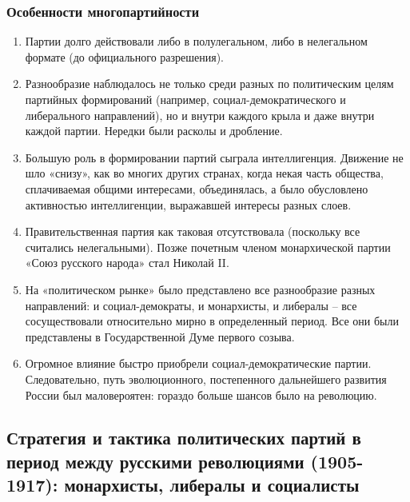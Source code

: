 \documentclass{article}
\begin{document}
\subsubsection{Особенности многопартийности}

\begin{enumerate}
    \item Партии долго действовали либо в полулегальном, либо в нелегальном формате (до официального разрешения).
    \item Разнообразие наблюдалось не только среди разных по политическим целям партийных формирований (например, социал-демократического и либерального направлений), но и внутри каждого крыла и даже внутри каждой партии. Нередки были расколы и дробление.
    \item Большую роль в формировании партий сыграла интеллигенция. Движение не шло «снизу», как во многих других странах, когда некая часть общества, сплачиваемая общими интересами, объединялась, а было обусловлено активностью интеллигенции, выражавшей интересы разных слоев.
    \item Правительственная партия как таковая отсутствовала (поскольку все считались нелегальными). Позже почетным членом монархической партии «Союз русского народа» стал Николай II.
    \item На «политическом рынке» было представлено все разнообразие разных направлений: и социал-демократы, и монархисты, и либералы – все сосуществовали относительно мирно в определенный период. Все они были представлены в Государственной Думе первого созыва.
    \item Огромное влияние быстро приобрели социал-демократические партии. Следовательно, путь эволюционного, постепенного дальнейшего развития России был маловероятен: гораздо больше шансов было на революцию.
\end{enumerate}

\pagebreak
\subsection{Стратегия и тактика политических партий в период между русскими революциями (1905-1917): монархисты, либералы и социалисты}
\end{document}
